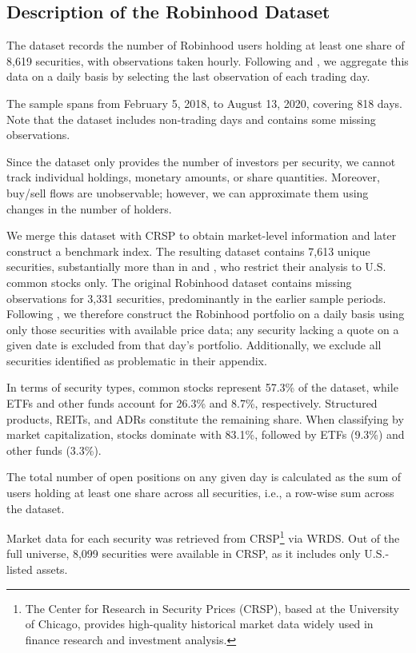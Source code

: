 \subsection{Description of the Robinhood Dataset}
The dataset records the number of Robinhood users holding at least one share of 8,619 securities, with observations taken hourly. 
Following \cite{Welch2022} and \cite{Fedyk2024}, we aggregate this data on a daily basis by selecting the last observation of each trading day.

The sample spans from February 5, 2018, to August 13, 2020, covering 818 days. Note that the dataset includes non-trading days and contains some missing observations.

Since the dataset only provides the number of investors per security, we cannot track individual holdings, monetary amounts, or share quantities. 
Moreover, buy/sell flows are unobservable; however, we can approximate them using changes in the number of holders.

We merge this dataset with CRSP to obtain market-level information and later construct a benchmark index. 
The resulting dataset contains 7,613 unique securities, substantially more than in \cite{Fedyk2024} and \cite{Welch2022}, who restrict their analysis to U.S. common stocks only. 
The original Robinhood dataset contains missing observations for 3,331 securities, predominantly in the earlier sample periods. 
Following \cite{Fedyk2024}, we therefore construct the Robinhood portfolio on a daily basis using only those securities with available price data; 
any security lacking a quote on a given date is excluded from that day's portfolio. 
Additionally, we exclude all securities identified as problematic in their appendix. 

In terms of security types, common stocks represent 57.3\% of the dataset, while ETFs and other funds account for 26.3\% and 8.7\%, respectively. 
Structured products, REITs, and ADRs constitute the remaining share. 
When classifying by market capitalization, stocks dominate with 83.1\%, followed by ETFs (9.3\%) and other funds (3.3\%).

The total number of open positions on any given day is calculated as the sum of users holding at least one share across all securities, i.e., a row-wise sum across the dataset.

Market data for each security was retrieved from CRSP\footnote{The Center for Research in Security Prices (CRSP), based at the University of Chicago, provides high-quality historical market data widely used in finance research and investment analysis.} via WRDS. 
Out of the full universe, 8,099 securities were available in CRSP, as it includes only U.S.-listed assets. 


